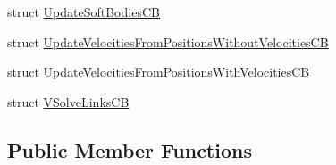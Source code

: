 \begin{DoxyCompactItemize}
\item 
struct \hyperlink{structbt_d_x11_soft_body_solver_1_1_update_soft_bodies_c_b}{Update\+Soft\+Bodies\+C\+B}
\item 
struct \hyperlink{structbt_d_x11_soft_body_solver_1_1_update_velocities_from_positions_without_velocities_c_b}{Update\+Velocities\+From\+Positions\+Without\+Velocities\+C\+B}
\item 
struct \hyperlink{structbt_d_x11_soft_body_solver_1_1_update_velocities_from_positions_with_velocities_c_b}{Update\+Velocities\+From\+Positions\+With\+Velocities\+C\+B}
\item 
struct \hyperlink{structbt_d_x11_soft_body_solver_1_1_v_solve_links_c_b}{V\+Solve\+Links\+C\+B}
\end{DoxyCompactItemize}
\subsection*{Public Member Functions}

